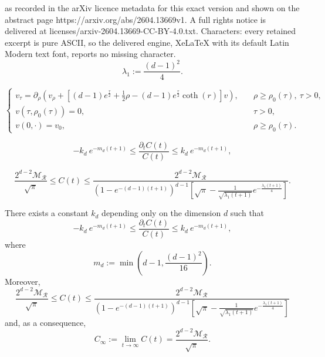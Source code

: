 \documentclass[10pt,a4paper]{amsart}
\begin{document}
as recorded in the arXiv licence metadata for this exact version and shown on the abstract page https://arxiv.org/abs/2604.13669v1. A full rights notice is delivered at licenses/arxiv-2604.13669-CC-BY-4.0.txt. Characters: every retained excerpt is pure ASCII, so the delivered engine, XeLaTeX with its default Latin Modern text font, reports no missing character.
\begin{equation}\label{eq:definition_bottom_spectrum_laplacian}
	\lambda_1:=\frac{(d-1)^2}{4}.
\end{equation}

\begin{equation}\label{eq:main_spherical_coordinates_symmetric_datum}
\begin{cases}
	v_\tau = \partial_\rho\left(v_\rho + \left[(d-1)e^{\frac{\tau}{2}}+\frac{1}{2}\rho- (d-1)e^{\frac{\tau}{2}}\coth(r)\right]  v\right),\quad &\rho\geq \rho_0(\tau),\ \tau>0,\\
	v(\tau, \rho_0(\tau))=0, &\tau>0,\\
	v(0,\cdot) = v_0, &\rho\geq \rho_0(\tau).
\end{cases}
\end{equation}

	\begin{equation}\label{eq:bound_quotient_C(t)}
	-k_d\  e^{-m_d (t+1)}\leq \frac{\partial_t C(t)}{C(t)}\leq k_d\  e^{-m_d (t+1)},
\end{equation}

\begin{equation}\label{eq:limit_C(t)}
	\frac{2^{d-2}\mathcal{M}_{\mathcal{R}}}{\sqrt{\pi} }\leq C(t)\leq \frac{2^{d-2}\mathcal{M}_{\mathcal{R}}}{(1-e^{-(d-1)(t+1)})^{d-1}\left[\sqrt{\pi} - \frac{1}{\sqrt{\lambda_1 (t+1)}}e^{-\frac{\lambda_1 (t+1)}{4}}\right]}.
\end{equation}

\begin{lem}\label{lem:constant_C(t)}
	There exists a constant $k_d$ depending only on the dimension $d$ such that
	\begin{equation*}
		-k_d\  e^{-m_d (t+1)}\leq \frac{\partial_t C(t)}{C(t)}\leq k_d\  e^{-m_d (t+1)},
	\end{equation*}
	where
	\[
	m_d := \min \left(d-1, \frac{(d-1)^2}{16}\right).
	\]
	Moreover,
	\begin{equation*}
		\frac{2^{d-2}\mathcal{M}_{\mathcal{R}}}{\sqrt{\pi} }\leq C(t)\leq \frac{2^{d-2}\mathcal{M}_{\mathcal{R}}}{(1-e^{-(d-1)(t+1)})^{d-1}\left[\sqrt{\pi} - \frac{1}{\sqrt{\lambda_1 (t+1)}}e^{-\frac{\lambda_1 (t+1)}{4}}\right]}
	\end{equation*}
	and, as a consequence,
	\[
	C_\infty:=\lim\limits_{t\to\infty} C(t) = \frac{2^{d-2}\mathcal{M}_{\mathcal{R}}}{\sqrt{\pi} }.
	\]
\end{lem}
\end{document}
